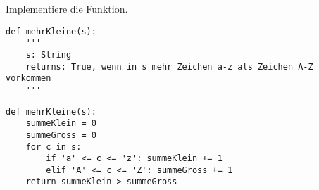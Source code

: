 \question[4] Implementiere die Funktion.

\begin{lstlisting}
def mehrKleine(s):
    '''
    s: String
    returns: True, wenn in s mehr Zeichen a-z als Zeichen A-Z vorkommen
    '''
\end{lstlisting}
\begin{solutionbox}{8cm}
\begin{lstlisting}
def mehrKleine(s):
    summeKlein = 0
    summeGross = 0
    for c in s:
        if 'a' <= c <= 'z': summeKlein += 1
        elif 'A' <= c <= 'Z': summeGross += 1
    return summeKlein > summeGross
\end{lstlisting}
\end{solutionbox}

